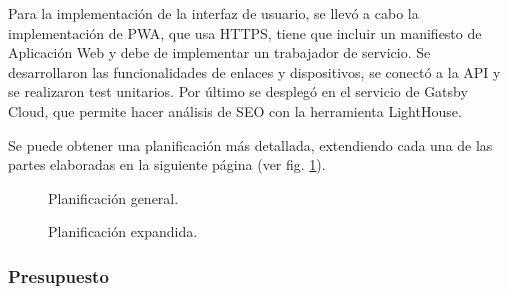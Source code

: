 \vspace{5mm}

\noindent Para la implementación de la interfaz de usuario, se llevó a cabo la implementación de PWA, que usa HTTPS, tiene 
que incluir un manifiesto de Aplicación Web y debe de implementar un trabajador de servicio. Se desarrollaron las 
funcionalidades de enlaces y dispositivos, se conectó a la API y se realizaron test unitarios. Por último se desplegó en el 
servicio de Gatsby Cloud, que permite hacer análisis de SEO con la herramienta LightHouse.

\vspace{5mm}

\noindent Se puede obtener una planificación más detallada, extendiendo cada una de las partes elaboradas en la siguiente
página (ver fig. \ref{fig:planificacion-general}).

\begin{landscape}
  \begin{figure}[h!]
    \centering
    \vspace*{\fill}
    \noindent
    \caption{Planificación general.}
    \label{fig:planificacion-general}
    \vspace*{\fill}
  \end{figure}

  \begin{figure}[h!]
    \centering
    \vspace*{\fill}
    \noindent
    \caption{Planificación expandida.}
    \label{fig:planificacion-expandida}
    \vspace*{\fill}
  \end{figure}
\end{landscape}

\subsubsection*{Presupuesto}

